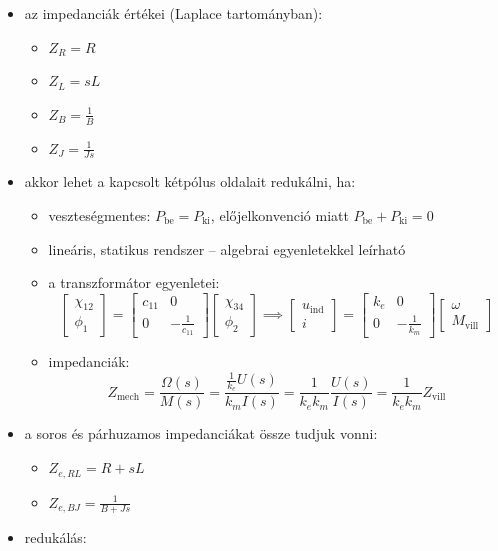 \begin{itemize}
    \item az impedanciák értékei (Laplace tartományban):
    \begin{itemize}
        \item $Z_R = R$
        \item $Z_L = sL$
        \item $Z_B = \frac{1}{B}$
        \item $Z_J = \frac{1}{Js}$
    \end{itemize}
    \item akkor lehet a kapcsolt kétpólus oldalait redukálni, ha:
    \begin{itemize}
        \item veszteségmentes: $P_{\text{be}} = P_{\text{ki}}$, előjelkonvenció miatt $P_{\text{be}} + P_{\text{ki}} = 0$
        \item lineáris, statikus rendszer -- algebrai egyenletekkel leírható
        \item a transzformátor egyenletei:
        $$ \begin{bmatrix} \chi_{12} \\ \phi_1 \end{bmatrix} = \begin{bmatrix} c_{11} & 0 \\ 0 & -\frac{1}{c_{11}} \end{bmatrix} \begin{bmatrix} \chi_{34} \\ \phi_2 \end{bmatrix} \implies \begin{bmatrix} u_{\text{ind}} \\ i \end{bmatrix} = \begin{bmatrix} k_e & 0 \\ 0 & -\frac{1}{k_m} \end{bmatrix} \begin{bmatrix} \omega \\ M_{\text{vill}} \end{bmatrix} $$
        \item impedanciák:
        $$ Z_{\text{mech}} = \frac{\Omega(s)}{M(s)} = \frac{\frac{1}{k_e} U(s)}{k_m I(s)} = \frac{1}{k_e k_m} \frac{U(s)}{I(s)} = \frac{1}{k_e k_m} Z_{\text{vill}} $$
    \end{itemize}
    \item a soros és párhuzamos impedanciákat össze tudjuk vonni:
    \begin{itemize}
        \item $Z_{e, RL} = R + sL$
        \item $Z_{e, BJ} = \frac{1}{B + Js}$
    \end{itemize}
    \item redukálás:
\end{itemize}

